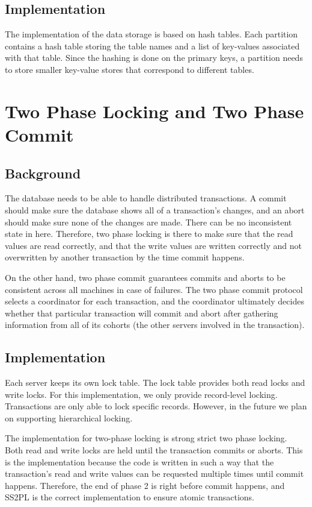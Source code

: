 \documentclass[a4paper, 10pt, notitlepage]{report}
\begin{document}
\subsection*{Implementation}
The implementation of the data storage is based on hash tables. Each partition contains a hash table storing the table names and a list
of key-values associated with that table. Since the hashing is done on the primary keys, a partition needs to store smaller key-value
stores that correspond to different tables. 

\section*{Two Phase Locking and Two Phase Commit}

\subsection*{Background}
The database needs to be able to handle distributed transactions. A commit should make sure the database shows all of a transaction's
changes, and an abort should make sure none of the changes are made. There can be no inconsistent state in here. Therefore, two phase
locking is there to make sure that the read values are read correctly, and that the write values are written correctly and not
overwritten by another transaction by the time commit happens.

On the other hand, two phase commit guarantees commits and aborts to be consistent across all machines in case of failures. The 
two phase commit protocol selects a coordinator for each transaction, and the coordinator ultimately decides whether that particular
transaction will commit and abort after gathering information from all of its cohorts (the other servers involved in the transaction).

\subsection*{Implementation}

Each server keeps its own lock table. The lock table provides both read locks and write locks. For this implementation, we only provide
record-level locking. Transactions are only able to lock specific records. However, in the future we plan on supporting hierarchical
locking. 

The implementation for two-phase locking is strong strict two phase locking. Both read and write locks are held until the transaction
commits or aborts. This is the implementation because the code is written in such a way that the transaction's read and write values
can be requested multiple times until commit happens. Therefore, the end of phase 2 is right before commit happens, and SS2PL is the
correct implementation to ensure atomic transactions.
\end{document}
